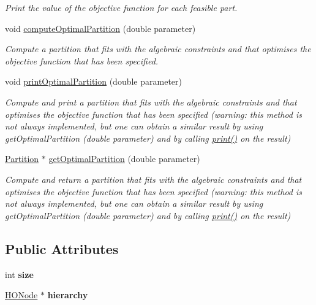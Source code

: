 \begin{DoxyCompactItemize}
\begin{DoxyCompactList}\small\item\em Print the value of the objective function for each feasible part. \end{DoxyCompactList}\item 
void \hyperlink{classHierarchicalOrderedSet_aaaf67ab7d39ab2ca599c0c5a6ac22ce6}{compute\-Optimal\-Partition} (double parameter)
\begin{DoxyCompactList}\small\item\em Compute a partition that fits with the algebraic constraints and that optimises the objective function that has been specified. \end{DoxyCompactList}\item 
void \hyperlink{classHierarchicalOrderedSet_ae4df851956e9f11dce35c726b01c2bad}{print\-Optimal\-Partition} (double parameter)
\begin{DoxyCompactList}\small\item\em Compute and print a partition that fits with the algebraic constraints and that optimises the objective function that has been specified (warning\-: this method is not always implemented, but one can obtain a similar result by using get\-Optimal\-Partition (double parameter) and by calling \hyperlink{classHierarchicalOrderedSet_adabb092a33f0a552d4a0e0a8cd8221bb}{print()} on the result) \end{DoxyCompactList}\item 
\hyperlink{classPartition}{Partition} $\ast$ \hyperlink{classHierarchicalOrderedSet_a627ce416d730e03c9d807366e4a79a78}{get\-Optimal\-Partition} (double parameter)
\begin{DoxyCompactList}\small\item\em Compute and return a partition that fits with the algebraic constraints and that optimises the objective function that has been specified (warning\-: this method is not always implemented, but one can obtain a similar result by using get\-Optimal\-Partition (double parameter) and by calling \hyperlink{classHierarchicalOrderedSet_adabb092a33f0a552d4a0e0a8cd8221bb}{print()} on the result) \end{DoxyCompactList}\end{DoxyCompactItemize}
\subsection*{Public Attributes}
\begin{DoxyCompactItemize}
\item 
\hypertarget{classHierarchicalOrderedSet_af9556ecd472342223afb1e215a263302}{int {\bfseries size}}\label{classHierarchicalOrderedSet_af9556ecd472342223afb1e215a263302}

\item 
\hypertarget{classHierarchicalOrderedSet_af0ca5b9cceec4d1552eeea4bf276ae31}{\hyperlink{classHONode}{H\-O\-Node} $\ast$ {\bfseries hierarchy}}\label{classHierarchicalOrderedSet_af0ca5b9cceec4d1552eeea4bf276ae31}

\end{DoxyCompactItemize}



